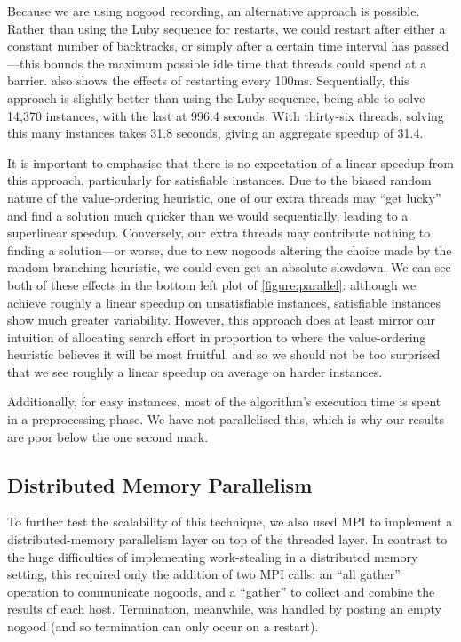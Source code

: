 \documentclass[runningheads]{llncs}
\begin{document}
Because we are using nogood recording, an alternative approach is possible. Rather than using the
Luby sequence for restarts, we could restart after either a constant number of backtracks, or simply
after a certain time interval has passed---this bounds the maximum possible idle time that threads
could spend at a barrier.  also shows the effects of restarting every 100ms.
Sequentially, this approach is slightly better than using the Luby sequence, being able to solve
14,370 instances, with the last at 996.4 seconds. With thirty-six threads, solving this many
instances takes 31.8 seconds, giving an aggregate speedup of 31.4.

It is important to emphasise that there is no expectation of a linear speedup from this approach,
particularly for satisfiable instances. Due to the biased random nature of the value-ordering heuristic,
one of our extra threads may ``get lucky'' and find a solution much quicker than we would
sequentially, leading to a superlinear speedup. Conversely, our extra threads may contribute nothing to finding a
solution---or worse, due to new nogoods altering the choice made by the random branching heuristic,
we could even get an absolute slowdown. We can see both of these effects in the bottom left plot of
\cref{figure:parallel}: although we achieve roughly a linear speedup on unsatisfiable instances,
satisfiable instances show much greater variability. However, this approach does at least mirror our intuition of
allocating search effort in proportion to where the value-ordering heuristic believes it will be
most fruitful, and so we should not be too surprised that we see roughly a linear speedup on average
on harder instances.

Additionally, for easy instances, most of the algorithm's execution time is spent in a preprocessing
phase. We have not parallelised this, which is why our results are poor below the one second mark.

\subsection{Distributed Memory Parallelism}

To further test the scalability of this technique, we also used MPI to implement a distributed-memory
parallelism layer on top of the threaded layer. In contrast to the huge difficulties of
implementing work-stealing in a distributed memory setting, this required only the addition of two
MPI calls: an ``all gather'' operation to communicate nogoods, and a ``gather'' to collect and
combine the results of each host. Termination, meanwhile, was handled by posting an empty nogood
(and so termination can only occur on a restart).
\end{document}
